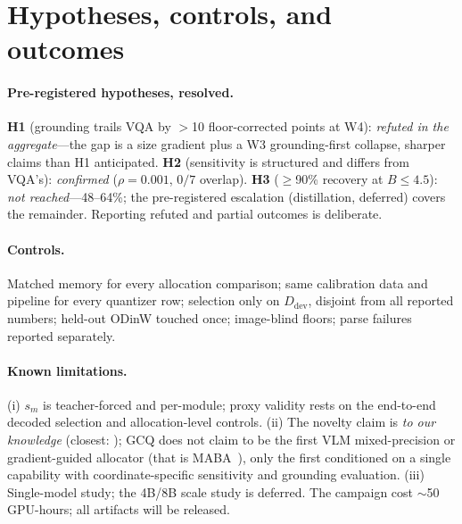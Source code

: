 \documentclass{article}
\begin{document}
\section{Hypotheses, controls, and outcomes}

\paragraph{Pre-registered hypotheses, resolved.} \textbf{H1} (grounding trails VQA by $>$10 floor-corrected points at W4): \emph{refuted in the aggregate}---the gap is a size gradient plus a W3 grounding-first collapse, sharper claims than H1 anticipated. \textbf{H2} (sensitivity is structured and differs from VQA's): \emph{confirmed} ($\rho=0.001$, $0/7$ overlap). \textbf{H3} ($\ge$90\% recovery at $B\le4.5$): \emph{not reached}---48--64\%; the pre-registered escalation (distillation, deferred) covers the remainder. Reporting refuted and partial outcomes is deliberate.

\paragraph{Controls.} Matched memory for every allocation comparison; same calibration data and pipeline for every quantizer row; selection only on $D_{\text{dev}}$, disjoint from all reported numbers; held-out ODinW touched once; image-blind floors; parse failures reported separately.

\paragraph{Known limitations.} (i) $s_m$ is teacher-forced and per-module; proxy validity rests on the end-to-end decoded selection and allocation-level controls. (ii) The novelty claim is \emph{to our knowledge} (closest: \cite{gwq,mbq,feather,nuwa,sqapvla,rethinkingsmall,maba}); GCQ does not claim to be the first VLM mixed-precision or gradient-guided allocator (that is MABA~\cite{maba}), only the first conditioned on a single capability with coordinate-specific sensitivity and grounding evaluation. (iii) Single-model study; the 4B/8B scale study is deferred. The campaign cost ${\sim}$50 GPU-hours; all artifacts will be released.
\end{document}
